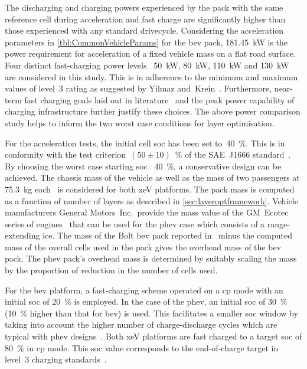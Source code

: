 The   discharging  and   charging  powers   experienced  by   the  pack   with
the same reference cell during acceleration and  fast charge  are significantly
higher than  those experienced with  any  standard  drivecycle.  Considering
the  acceleration  parameters  in \cref{tbl:CommonVehicleParams} for  the
\gls{bev}  pack, \SI{181.45}{\kilo\watt} is   the  power   requirement  for
acceleration  of   a  fixed   vehicle  mass on   a   flat  road   surface.
Four   distinct  fast-charging   power   levels \viz~\SI{50}{\kilo\watt},
\SI{80}{\kilo\watt},  \SI{110}{\kilo\watt}   and \SI{130}{\kilo\watt}  are
considered  in this  study.  This is  in adherence  to the  minimum  and maximum
values  of  level~3  rating  as suggested  by  Yilmaz
and~Krein~\cite{Yilmaz2012}. Furthermore, near-term fast charging goals laid out
in  literature~\cite{Ashique2017,Srdic2016} and  the  peak  power capability  of
charging infrastructure further justify these choices. The above power
comparison study helps to inform the two worst case conditions for layer
optimisation.



For  the   acceleration  tests,  the   initial  cell  \gls{soc}  has   been  set
to~\SI{40}{\percent}.  This is  in conformity  with the  test criterion~${(50\pm
10)}$~\%  of  the  SAE~J1666  standard~\cite{Sae2010}.  By  choosing  the  worst
case  starting \gls{soc}  \ie~\SI{40}{\percent},  a conservative  design can  be
achieved.  The  chassis  mass  of  the  vehicle as  well  as  the  mass  of  two
passengers at  \SI{75.3}{\kilogram} each~\cite{Sae2010}  is considered  for both
\gls{xeV}  platforms. The  pack mass  is  computed as  a function  of number  of
layers  as  described  in  \cref{sec:layeroptframework}.  Vehicle  manufacturers
General  Motors~Inc.\,  provide  the  mass  value of  the  GM~Ecotec  series  of
engines~\cite{motortrendEcotec} that can  be used for the  \gls{phev} case which
consists of  a range-extending \gls{ice}.  The mass  of the Bolt  \gls{bev} pack
reported in~\cite{ChevyBoltSpecs} minus  the computed mass of  the overall cells
used in the pack  gives the overhead mass of the  \gls{bev} pack. The \gls{phev}
pack's  overhead  mass  is  determined  by suitably  scaling  the  mass  by  the
proportion of reduction in the number of cells used.


For the \gls{bev}  platform, a fast-charging scheme operated on  a \gls{cp} mode
with an initial  \gls{soc} of \SI{20}{\percent} is employed. In  the case of the
\gls{phev}, an initial \gls{soc}  of \SI{30}{\percent} (\SI{10}{\percent} higher
than that for \gls{bev}) is used. This facilitates a smaller \gls{soc} window by
taking  into account  the higher  number  of charge-discharge  cycles which  are
typical with \gls{phev}  designs~\cite{Maksimovic2012}. Both \gls{xeV} platforms
are fast  charged to a target  \gls{soc} of \SI{80}{\percent} in  \gls{cp} mode.
This \gls{soc} value corresponds to the end-of-charge target in level~3 charging
standards~\cite{SAECharging2011}.

